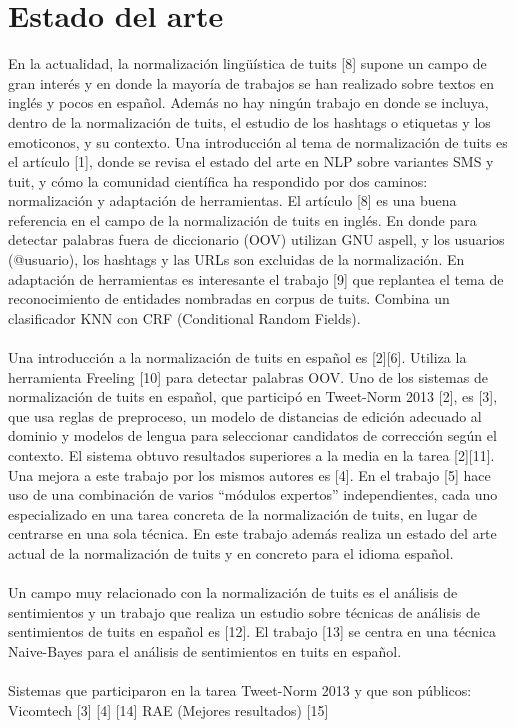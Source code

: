 \documentclass[14pt]{extarticle}
\theoremstyle{definition}
\theoremstyle{remark}
\begin{document}
\section{Estado del arte}\label{sec:estadodelarte}
En la actualidad, la normalización lingüística de tuits [8] supone un campo de gran interés y en donde la mayoría de trabajos se han realizado sobre textos en inglés y pocos en español. Además no hay ningún trabajo en donde se incluya, dentro de la normalización de tuits, el estudio de los hashtags o etiquetas y los emoticonos, y su contexto. 
Una introducción al tema de normalización de tuits es el artículo [1], donde se revisa el estado del arte en NLP sobre variantes SMS y tuit, y cómo la comunidad científica ha respondido por dos caminos: normalización y adaptación de herramientas.
El artículo [8] es una buena referencia en el campo de la normalización de tuits en inglés. En donde para detectar palabras fuera de diccionario (OOV) utilizan GNU aspell, y los usuarios (@usuario), los hashtags y las URLs son excluidas de la normalización. En adaptación de herramientas es interesante el trabajo [9] que replantea el tema de reconocimiento de entidades nombradas en corpus de tuits. Combina un clasificador KNN con CRF (Conditional Random Fields).
\\\\
Una introducción a la normalización de tuits en español es [2][6]. Utiliza la herramienta Freeling [10] para detectar palabras OOV. Uno de los sistemas de normalización de tuits en español, que participó en Tweet-Norm 2013 [2], es [3], que usa reglas de preproceso, un modelo de distancias de edición adecuado al dominio y modelos de lengua para seleccionar candidatos de corrección según el contexto. El sistema obtuvo resultados superiores a la media en la tarea [2][11]. Una mejora a este trabajo por los mismos autores es [4]. En el trabajo [5] hace uso de una combinación de varios “módulos expertos” independientes, cada uno especializado en una tarea concreta de la normalización de tuits, en lugar de centrarse en una sola técnica. En este trabajo además realiza un estado del arte actual de la normalización de tuits y en concreto para el idioma español.
\\\\
Un campo muy relacionado con la normalización de tuits es el análisis de sentimientos y un trabajo que realiza un estudio sobre técnicas de análisis de sentimientos de tuits en español es [12]. El trabajo [13] se centra en una técnica Naive-Bayes para el análisis de sentimientos en tuits en español.
\\\\
Sistemas que participaron en la tarea Tweet-Norm 2013 y que son públicos:
Vicomtech [3] [4] [14]
RAE (Mejores resultados) [15]
\end{document}
